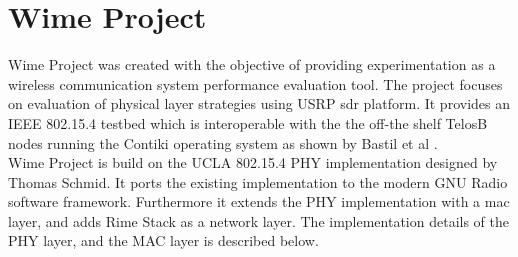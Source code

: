 \section{Wime Project}
Wime Project \cite{noauthor_wime_nodate} was created with the objective of providing experimentation as a wireless communication system performance evaluation tool.
The project focuses on evaluation of physical layer strategies using \ac{USRP} \ac{sdr} platform.
It provides an IEEE 802.15.4 testbed which is interoperable with the the off-the shelf TelosB nodes running the Contiki operating system as shown by Bastil et al \cite{bloessl2013gnu}.\\

Wime Project is build on the UCLA 802.15.4 PHY implementation \cite{ucla_phy} designed  by Thomas Schmid.
It ports the existing implementation to the modern GNU Radio software framework.
Furthermore it extends the PHY implementation with a \ac{mac} layer, and adds Rime Stack as a network layer.
The implementation details of the PHY layer, and the MAC layer is described below.\\

